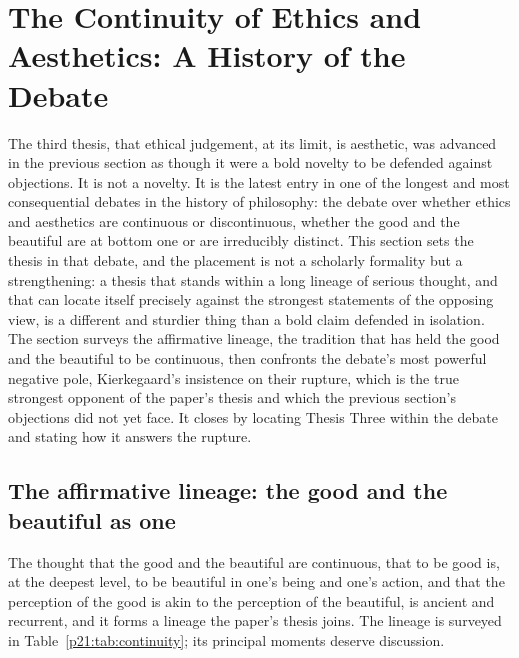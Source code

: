 \section{The Continuity of Ethics and Aesthetics: A History of the Debate}
\label{p21:sec:continuity}

\noindent
The third thesis, that ethical judgement, at its limit, is aesthetic, was advanced in the previous section as though it were a bold novelty to be defended against objections. It is not a novelty. It is the latest entry in one of the longest and most consequential debates in the history of philosophy: the debate over whether ethics and aesthetics are continuous or discontinuous, whether the good and the beautiful are at bottom one or are irreducibly distinct. This section sets the thesis in that debate, and the placement is not a scholarly formality but a strengthening: a thesis that stands within a long lineage of serious thought, and that can locate itself precisely against the strongest statements of the opposing view, is a different and sturdier thing than a bold claim defended in isolation. The section surveys the affirmative lineage, the tradition that has held the good and the beautiful to be continuous, then confronts the debate's most powerful negative pole, Kierkegaard's insistence on their rupture, which is the true strongest opponent of the paper's thesis and which the previous section's objections did not yet face. It closes by locating Thesis Three within the debate and stating how it answers the rupture.

\subsection{The affirmative lineage: the good and the beautiful as one}
\label{p21:sub:cont-affirmative}

The thought that the good and the beautiful are continuous, that to be good is, at the deepest level, to be beautiful in one's being and one's action, and that the perception of the good is akin to the perception of the beautiful, is ancient and recurrent, and it forms a lineage the paper's thesis joins. The lineage is surveyed in Table~\ref{p21:tab:continuity}; its principal moments deserve discussion.

